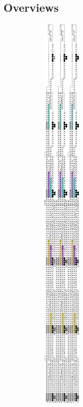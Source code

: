     \subsection{Overviews}

    \begin{figure}[H]
        \centering
        \begin{subfigure}[t]{0.2\textwidth}
            \centering
            \includegraphics[width=0.2\textwidth]{full_overview_case3_colored}

\end{subfigure}
\end{figure}
